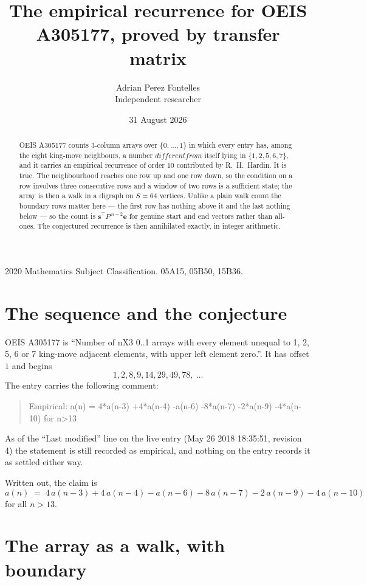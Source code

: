 \documentclass[11pt,a4paper]{article}
\title{The empirical recurrence for OEIS A305177, proved by transfer matrix}
\author{Adrian Perez Fontelles\\ \small Independent researcher}
\date{31 August 2026}
\theoremstyle{plain}
\theoremstyle{definition}
\begin{document}
\maketitle

\begin{abstract}
OEIS A305177 counts $3$-column arrays over $\{0,\dots,1\}$ in which every entry has,
among the eight king-move neighbours, a number $different from$ itself lying in $\{1,2,5,6,7\}$, and it carries an empirical
recurrence of order $10$ contributed by R.~H.~Hardin. It is true. The neighbourhood
reaches one row up and one row down, so the condition on a row involves three consecutive
rows and a window of two rows is a sufficient state; the array is then a walk in a digraph
on $S=64$ vertices. Unlike a plain walk count the boundary rows matter here --- the first
row has nothing above it and the last nothing below --- so the count is
$\mathbf{s}^{\!\top}P^{\,n-2}\mathbf{e}$ for genuine start and end vectors rather than
all-ones. The conjectured recurrence is then annihilated exactly, in integer arithmetic.
\end{abstract}

\noindent\small 2020 Mathematics Subject Classification. 05A15, 05B50, 15B36.\normalsize

\section{The sequence and the conjecture}

OEIS A305177 is ``Number of nX3 0..1 arrays with every element unequal to 1, 2, 5, 6 or 7 king-move adjacent elements, with upper left element zero.''. It has offset
$1$ and begins
\[
1, 2, 8, 9, 14, 29, 49, 78,\ \dots
\]
The entry carries the following comment:
\begin{quote}\small
Empirical: a(n) = 4*a(n-3) +4*a(n-4) -a(n-6) -8*a(n-7) -2*a(n-9) -4*a(n-10) for n>13
\end{quote}
As of the ``Last modified'' line on the live entry (May 26 2018 18:35:51, revision
4) the statement is still recorded as empirical, and nothing on the entry
records it as settled either way.

Written out, the claim is
\begin{equation}\label{eq:conj}
a(n)\;=\;4\,a(n-3) + 4\,a(n-4) - a(n-6) - 8\,a(n-7) - 2\,a(n-9) - 4\,a(n-10)
\end{equation}
for all $n>13$.

\section{The array as a walk, with boundary}
\end{document}
